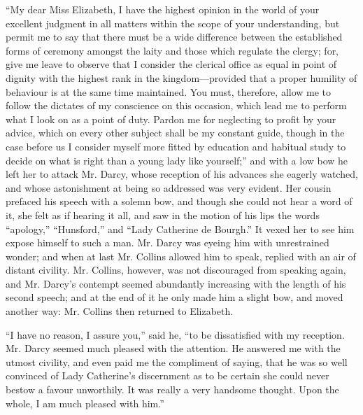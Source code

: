 ``My dear Miss Elizabeth, I have the highest opinion in the world of your excellent judgment in all matters within the scope of your understanding, but permit me to say that there must be a wide difference between the established forms of ceremony amongst the laity and those which regulate the clergy; for, give me leave to observe that I consider the clerical office as equal in point of dignity with the highest rank in the kingdom---provided that a proper humility of behaviour is at the same time maintained. You must, therefore, allow me to follow the dictates of my conscience on this occasion, which lead me to perform what I look on as a point of duty. Pardon me for neglecting to profit by your advice, which on every other subject shall be my constant guide, though in the case before us I consider myself more fitted by education and habitual study to decide on what is right than a young lady like yourself;'' and with a low bow he left her to attack Mr. Darcy, whose reception of his advances she eagerly watched, and whose astonishment at being so addressed was very evident. Her cousin prefaced his speech with a solemn bow, and though she could not hear a word of it, she felt as if hearing it all, and saw in the motion of his lips the words ``apology,'' ``Hunsford,'' and ``Lady Catherine de Bourgh.'' It vexed her to see him expose himself to such a man. Mr. Darcy was eyeing him with unrestrained wonder; and when at last Mr. Collins allowed him to speak, replied with an air of distant civility. Mr. Collins, however, was not discouraged from speaking again, and Mr. Darcy's contempt seemed abundantly increasing with the length of his second speech; and at the end of it he only made him a slight bow, and moved another way: Mr. Collins then returned to Elizabeth.

``I have no reason, I assure you,'' said he, ``to be dissatisfied with my reception. Mr. Darcy seemed much pleased with the attention. He answered me with the utmost civility, and even paid me the compliment of saying, that he was so well convinced of Lady Catherine's discernment as to be certain she could never bestow a favour unworthily. It was really a very handsome thought. Upon the whole, I am much pleased with him.''

